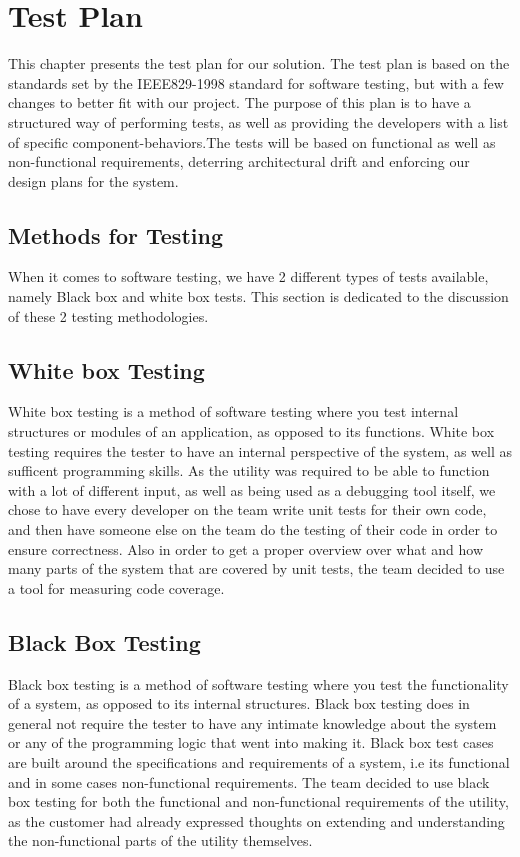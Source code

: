 \chapter{Test Plan}
This chapter presents the test plan for our solution. The test plan is based on
the standards set by the IEEE829-1998 standard for software testing, but with a
few changes to better fit with our project. The purpose of this plan is to have
a structured way of performing tests, as well as providing the developers with
a list of specific component-behaviors.The tests will be based on functional as
well as non-functional requirements, deterring architectural drift and
enforcing our design plans for the system.


\section{Methods for Testing}
When it comes to software testing, we have 2 different types of tests available, namely Black box and white box tests. This section is dedicated to the discussion of these 2 testing methodologies.


\section{White box Testing}
White box testing is a method of software testing where you test internal structures or modules of an application, as opposed to its functions. White box testing requires the tester to have an internal perspective of the system, as well as sufficent programming skills. As the utility was required to be able to function with a lot of different input, as well as being used as a debugging tool itself, we chose to have every developer on the team write unit tests for their own code, and then have someone else on the team do the testing of their code in order to ensure correctness. Also in order to get a proper overview over what and how many parts of the system that are covered by unit tests, the team decided to use a tool for measuring code coverage.


\section{Black Box Testing}
Black box testing is a method of software testing where you test the functionality of a system, as opposed to its internal structures. Black box testing does in general not require the tester to have any intimate knowledge about the system or any of the programming logic that went into making it. Black box test cases are built around the specifications and requirements of a system, i.e its functional and in some cases non-functional requirements. The team decided to use black box testing for both the functional and non-functional requirements of the utility, as the customer had already expressed thoughts on extending and understanding the non-functional parts of the utility themselves. 


